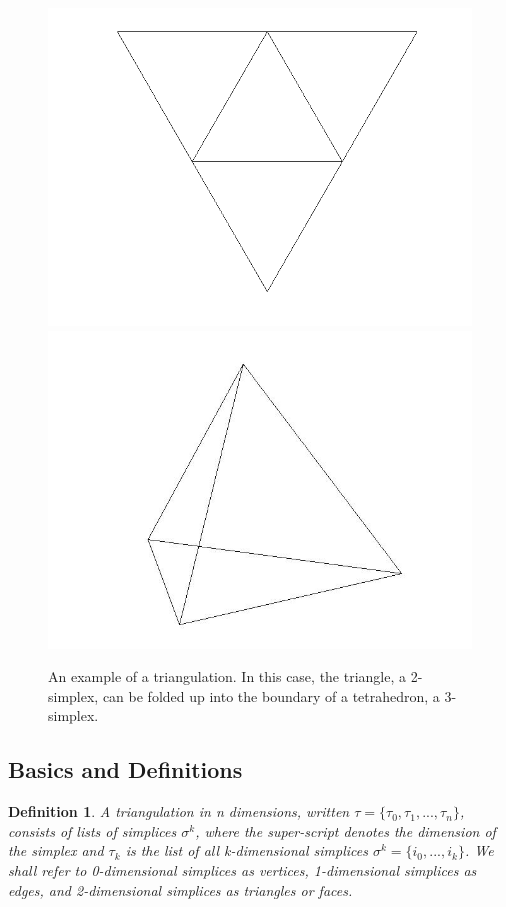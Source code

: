 \documentclass[12pt]{article}
\newtheorem{definition}[theorem]{Definition}
\begin{document}
\begin{figure}
\includegraphics[scale = 0.5]{Pictures/flattetrahedron.png}
\includegraphics[scale = 0.3]{Pictures/tetrahedron.jpg}
\caption{An example of a triangulation. In this case, the triangle, a 2-simplex, can be folded up into the boundary of a tetrahedron, a 3-simplex.}
\end{figure}

\subsection{Basics and Definitions}
\label{BaD}

\begin{definition}
\label{tridef}
A triangulation in \textit{n} dimensions, written $\tau = \{\tau_0, \tau_1, ... , \tau_n\}$, consists of lists of simplices $\sigma^k$, where the super-script denotes the dimension of the simplex and $\tau_k$ is the list of all \textit{k}-dimensional simplices $\sigma^k = \{i_0, ... , i_k\}$. We shall refer to 0-dimensional simplices as vertices, 1-dimensional simplices as edges, and 2-dimensional simplices as triangles or faces.
\end{definition}
\end{document}
